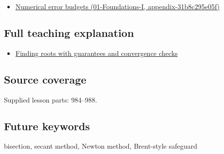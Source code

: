 \begin{itemize}
\tightlist
\item
  \href{../01-Foundations-I/main.pdf\#nameddest=appendix-31b8c295e05f}{Numerical error budgets (01-Foundations-I, appendix-31b8c295e05f)}
\end{itemize}

\subsection{Full teaching explanation}\label{appendix-f63eb850796d-full-teaching-explanation}

\begin{itemize}
\tightlist
\item
  \hyperref[02-foundations-ii-ch028-finding-roots-with-guarantees-and-convergence-checks]{Finding roots with guarantees and convergence checks}
\end{itemize}

\subsection{Source coverage}\label{appendix-f63eb850796d-source-coverage}

Supplied lesson parts: 984--988.

\subsection{Future keywords}\label{appendix-f63eb850796d-future-keywords}

bisection, secant method, Newton method, Brent-style safeguard
